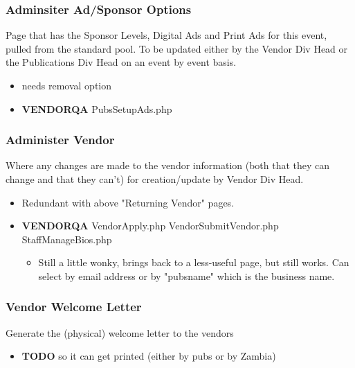 \documentclass[captions=tablesignature]{scrartcl}
\begin{document}
\subsubsection{Adminsiter Ad/Sponsor Options}
\label{sec-3-1-14}
Page that has the Sponsor Levels, Digital Ads and Print Ads for
this event, pulled from the standard pool.  To be updated either
by the Vendor Div Head or the Publications Div Head on an event by
event basis.
\begin{itemize}
\item needs removal option
\end{itemize}
\begin{itemize}
\item {\bfseries\sffamily VENDORQA} PubsSetupAds.php
\label{sec-3-1-14-1}
\end{itemize}

\subsubsection{Administer Vendor}
\label{sec-3-1-15}
Where any changes are made to the vendor information (both that
they can change and that they can't) for creation/update by Vendor
Div Head.
\begin{itemize}
\item Redundant with above "Returning Vendor" pages.
\end{itemize}
\begin{itemize}
\item {\bfseries\sffamily VENDORQA} VendorApply.php VendorSubmitVendor.php StaffManageBios.php
\label{sec-3-1-15-1}
\begin{itemize}
\item Still a little wonky, brings back to a less-useful page, but
still works.  Can select by email address or by "pubsname"
which is the business name.
\end{itemize}
\end{itemize}

\subsubsection{Vendor Welcome Letter}
\label{sec-3-1-16}
Generate the (physical) welcome letter to the vendors
\begin{itemize}
\item {\bfseries\sffamily TODO} so it can get printed (either by pubs or by Zambia)
\label{sec-3-1-16-1}
\end{itemize}
\end{document}
